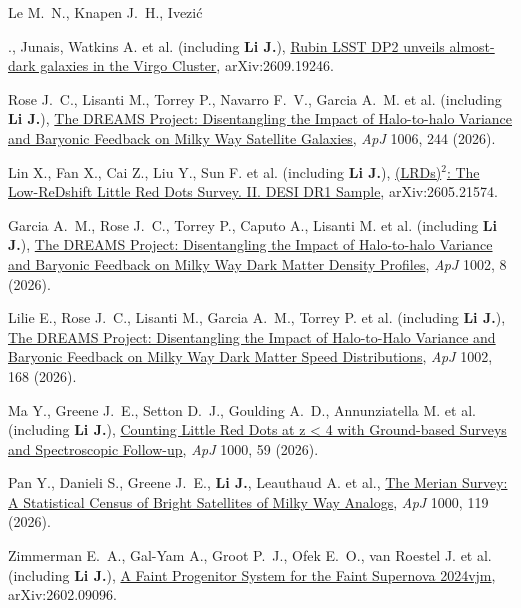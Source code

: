 \item Le M.~N., Knapen J.~H., Ivezi{\'c} {., {Junais}, Watkins A. et al. (including \textbf{Li J.}), \href{https://ui.adsabs.harvard.edu/abs/2026arXiv260919246L}{Rubin LSST DP2 unveils almost-dark galaxies in the Virgo Cluster}, arXiv:2609.19246.

\item Rose J.~C., Lisanti M., Torrey P., Navarro F.~V., Garcia A.~M. et al. (including \textbf{Li J.}), \href{https://ui.adsabs.harvard.edu/abs/2026ApJ..1006..244R}{The DREAMS Project: Disentangling the Impact of Halo-to-halo Variance and Baryonic Feedback on Milky Way Satellite Galaxies}, \textit{ApJ} 1006, 244 (2026).

\item Lin X., Fan X., Cai Z., Liu Y., Sun F. et al. (including \textbf{Li J.}), \href{https://ui.adsabs.harvard.edu/abs/2026arXiv260521574L}{(LRDs)$^2$: The Low-ReDshift Little Red Dots Survey. II. DESI DR1 Sample}, arXiv:2605.21574.

\item Garcia A.~M., Rose J.~C., Torrey P., Caputo A., Lisanti M. et al. (including \textbf{Li J.}), \href{https://ui.adsabs.harvard.edu/abs/2026ApJ..1002....8G}{The DREAMS Project: Disentangling the Impact of Halo-to-halo Variance and Baryonic Feedback on Milky Way Dark Matter Density Profiles}, \textit{ApJ} 1002, 8 (2026).

\item Lilie E., Rose J.~C., Lisanti M., Garcia A.~M., Torrey P. et al. (including \textbf{Li J.}), \href{https://ui.adsabs.harvard.edu/abs/2026ApJ..1002..168L}{The DREAMS Project: Disentangling the Impact of Halo-to-Halo Variance and Baryonic Feedback on Milky Way Dark Matter Speed Distributions}, \textit{ApJ} 1002, 168 (2026).

\item Ma Y., Greene J.~E., Setton D.~J., Goulding A.~D., Annunziatella M. et al. (including \textbf{Li J.}), \href{https://ui.adsabs.harvard.edu/abs/2026ApJ..1000...59M}{Counting Little Red Dots at z < 4 with Ground-based Surveys and Spectroscopic Follow-up}, \textit{ApJ} 1000, 59 (2026).

\item Pan Y., Danieli S., Greene J.~E., \textbf{Li J.}, Leauthaud A. et al., \href{https://ui.adsabs.harvard.edu/abs/2026ApJ..1000..119P}{The Merian Survey: A Statistical Census of Bright Satellites of Milky Way Analogs}, \textit{ApJ} 1000, 119 (2026).

\item Zimmerman E.~A., Gal-Yam A., Groot P.~J., Ofek E.~O., van Roestel J. et al. (including \textbf{Li J.}), \href{https://ui.adsabs.harvard.edu/abs/2026arXiv260209096Z}{A Faint Progenitor System for the Faint Supernova 2024vjm}, arXiv:2602.09096.

}
